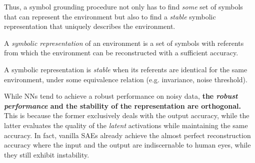Thus, a symbol grounding procedure not only has to find \emph{some} set of symbols that can represent the
environment but also to find a \emph{stable} symbolic representation that uniquely describes the environment.

\begin{defi}
A \emph{symbolic representation} of an environment is a set of symbols with referents
from which the environment can be reconstructed with a sufficient accuracy.
\end{defi}

\begin{defi}
A symbolic representation is \emph{stable} when its referents are identical
for the same environment, under some equivalence relation (e.g. invariance, noise threshold).
\end{defi}



While NNs tend to achieve a robust performance on noisy data,
\textbf{the \emph{robust performance} and the stability of the representation are orthogonal.}
This is because the former exclusively deals with the output accuracy,
while the latter evaluates the quality of the \emph{latent} activations while maintaining the same accuracy.
In fact, vanilla SAEs already achieve the almost perfect reconstruction accuracy
where the input and the output are indiscernable to human eyes,
while they still exhibit instability.

